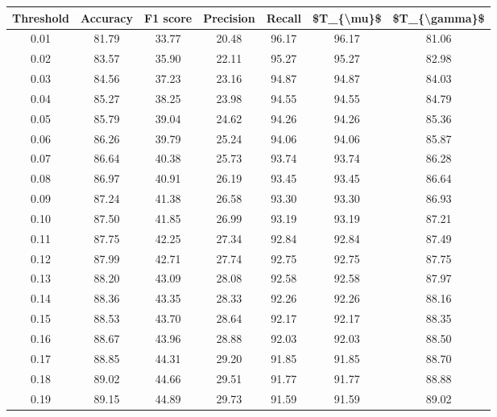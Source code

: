 \begin{tabular}{|c|c|c|c|c|c|c|}
\hline
 Threshold &  Accuracy &  F1 score &  Precision &  Recall &  \$T\_\{\textbackslash mu\}\$ &  \$T\_\{\textbackslash gamma\}\$ \\
\hline
      0.01 &     81.79 &     33.77 &      20.48 &   96.17 &      96.17 &         81.06 \\
      0.02 &     83.57 &     35.90 &      22.11 &   95.27 &      95.27 &         82.98 \\
      0.03 &     84.56 &     37.23 &      23.16 &   94.87 &      94.87 &         84.03 \\
      0.04 &     85.27 &     38.25 &      23.98 &   94.55 &      94.55 &         84.79 \\
      0.05 &     85.79 &     39.04 &      24.62 &   94.26 &      94.26 &         85.36 \\
      0.06 &     86.26 &     39.79 &      25.24 &   94.06 &      94.06 &         85.87 \\
      0.07 &     86.64 &     40.38 &      25.73 &   93.74 &      93.74 &         86.28 \\
      0.08 &     86.97 &     40.91 &      26.19 &   93.45 &      93.45 &         86.64 \\
      0.09 &     87.24 &     41.38 &      26.58 &   93.30 &      93.30 &         86.93 \\
      0.10 &     87.50 &     41.85 &      26.99 &   93.19 &      93.19 &         87.21 \\
      0.11 &     87.75 &     42.25 &      27.34 &   92.84 &      92.84 &         87.49 \\
      0.12 &     87.99 &     42.71 &      27.74 &   92.75 &      92.75 &         87.75 \\
      0.13 &     88.20 &     43.09 &      28.08 &   92.58 &      92.58 &         87.97 \\
      0.14 &     88.36 &     43.35 &      28.33 &   92.26 &      92.26 &         88.16 \\
      0.15 &     88.53 &     43.70 &      28.64 &   92.17 &      92.17 &         88.35 \\
      0.16 &     88.67 &     43.96 &      28.88 &   92.03 &      92.03 &         88.50 \\
      0.17 &     88.85 &     44.31 &      29.20 &   91.85 &      91.85 &         88.70 \\
      0.18 &     89.02 &     44.66 &      29.51 &   91.77 &      91.77 &         88.88 \\
      0.19 &     89.15 &     44.89 &      29.73 &   91.59 &      91.59 &         89.02 \\

\end{tabular}

